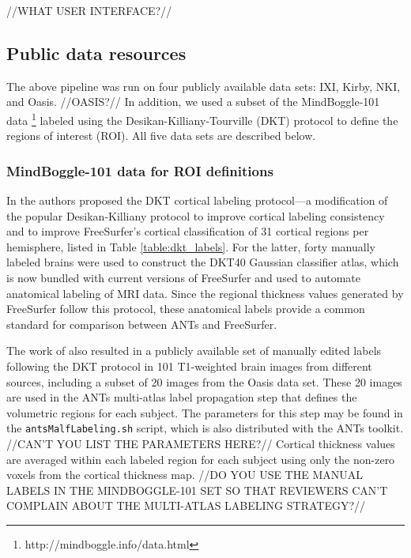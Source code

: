 //WHAT USER INTERFACE?//

\subsection{Public data resources}

The above pipeline was run on four publicly available data sets:
IXI, Kirby, NKI, and Oasis.  //OASIS?//
In addition, we used a subset of the MindBoggle-101 data%
\footnote{
http://mindboggle.info/data.html
} 
labeled using the 
Desikan-Killiany-Tourville (DKT) protocol \citep{klein2012} to define the
regions of interest (ROI).
All five data sets are described below.

\subsubsection{MindBoggle-101 data for ROI definitions}

In \cite{klein2012} the authors proposed the DKT cortical labeling protocol---a modification of the
popular Desikan-Killiany protocol \cite{desikan2006} to improve cortical labeling
consistency and to improve FreeSurfer's cortical classification of 31 cortical regions per hemisphere,
listed in Table \ref{table:dkt_labels}.
For the latter, forty manually labeled brains were used to construct the DKT40 Gaussian classifier atlas,
which is now bundled with current versions of FreeSurfer and
used to automate anatomical labeling of MRI data.
Since the regional thickness values generated by FreeSurfer follow this protocol,
these anatomical labels provide a common standard for comparison between ANTs and FreeSurfer.

The work of \cite{klein2012} also resulted in a publicly available set of
manually edited labels following the DKT protocol in 101
T1-weighted  brain images from different sources, including a subset of 20 images
from the Oasis data set.  These 20 images are used in the ANTs
multi-atlas label propagation \cite{wang2013} step that defines the volumetric regions for each subject.
The parameters for this step may be found in the {\tt antsMalfLabeling.sh} script, which is also
distributed with the ANTs toolkit.  //CAN'T YOU LIST THE PARAMETERS HERE?//
Cortical thickness values are averaged within each labeled region for each subject using only
the non-zero voxels from the cortical thickness map.
//DO YOU USE THE MANUAL LABELS IN THE MINDBOGGLE-101 SET SO THAT REVIEWERS CAN'T
COMPLAIN ABOUT THE MULTI-ATLAS LABELING STRATEGY?//


